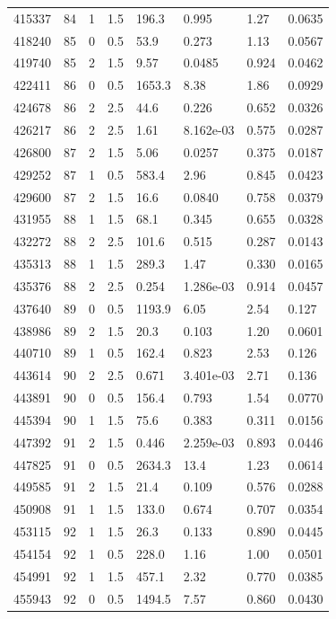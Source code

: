 \documentclass[preview]{standalone}
\begin{document}
{{{{{{{\begin{tabular}{L{1.2cm}C{1.2cm} C{0.3cm}C{0.5cm} C{1.4cm}C{1.4cm} C{1.4cm}C{1.4cm}}
  415337  &    84  & 1     & 1.5 &  196.3  & 0.995  & 1.27 &  0.0635   \\ 
  418240  &    85  & 0     & 0.5 &  53.9  & 0.273  & 1.13 &  0.0567   \\ 
  419740  &    85  & 2     & 1.5 &  9.57  & 0.0485  & 0.924 &  0.0462   \\ 
  422411  &    86  & 0     & 0.5 &  1653.3  & 8.38  & 1.86 &  0.0929   \\ 
  424678  &    86  & 2     & 2.5 &  44.6  & 0.226  & 0.652 &  0.0326   \\ 
  426217  &    86  & 2     & 2.5 &  1.61  & 8.162e-03  & 0.575 &  0.0287   \\ 
  426800  &    87  & 2     & 1.5 &  5.06  & 0.0257  & 0.375 &  0.0187   \\ 
  429252  &    87  & 1     & 0.5 &  583.4  & 2.96  & 0.845 &  0.0423   \\ 
  429600  &    87  & 2     & 1.5 &  16.6  & 0.0840  & 0.758 &  0.0379   \\ 
  431955  &    88  & 1     & 1.5 &  68.1  & 0.345  & 0.655 &  0.0328   \\ 
  432272  &    88  & 2     & 2.5 &  101.6  & 0.515  & 0.287 &  0.0143   \\ 
  435313  &    88  & 1     & 1.5 &  289.3  & 1.47  & 0.330 &  0.0165   \\ 
  435376  &    88  & 2     & 2.5 &  0.254  & 1.286e-03  & 0.914 &  0.0457   \\ 
  437640  &    89  & 0     & 0.5 &  1193.9  & 6.05  & 2.54 &  0.127   \\ 
  438986  &    89  & 2     & 1.5 &  20.3  & 0.103  & 1.20 &  0.0601   \\ 
  440710  &    89  & 1     & 0.5 &  162.4  & 0.823  & 2.53 &  0.126   \\ 
  443614  &    90  & 2     & 2.5 &  0.671  & 3.401e-03  & 2.71 &  0.136   \\ 
  443891  &    90  & 0     & 0.5 &  156.4  & 0.793  & 1.54 &  0.0770   \\ 
  445394  &    90  & 1     & 1.5 &  75.6  & 0.383  & 0.311 &  0.0156   \\ 
  447392  &    91  & 2     & 1.5 &  0.446  & 2.259e-03  & 0.893 &  0.0446   \\ 
  447825  &    91  & 0     & 0.5 &  2634.3  & 13.4  & 1.23 &  0.0614   \\ 
  449585  &    91  & 2     & 1.5 &  21.4  & 0.109  & 0.576 &  0.0288   \\ 
  450908  &    91  & 1     & 1.5 &  133.0  & 0.674  & 0.707 &  0.0354   \\ 
  453115  &    92  & 1     & 1.5 &  26.3  & 0.133  & 0.890 &  0.0445   \\ 
  454154  &    92  & 1     & 0.5 &  228.0  & 1.16  & 1.00 &  0.0501   \\ 
  454991  &    92  & 1     & 1.5 &  457.1  & 2.32  & 0.770 &  0.0385   \\ 
  455943  &    92  & 0     & 0.5 &  1494.5  & 7.57  & 0.860 &  0.0430   \\ 
\hline 
\end{tabular} 

}}}}}}}
\end{document}
